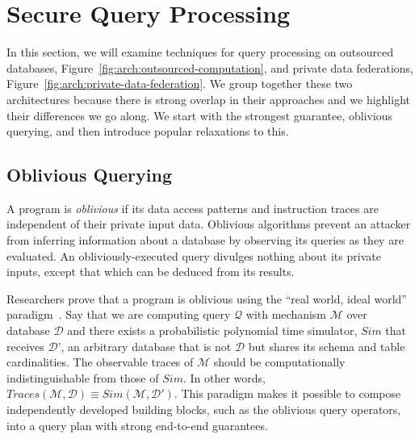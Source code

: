 \documentclass[11pt]{article}
\newcommand{\mechanism}{$\mathcal{M}$\xspace}
\newcommand{\db}{$\mathcal{D}$\xspace}
\newcommand{\query}{$\mathcal{Q}$\xspace}
\newcommand{\cut}[1]{}
\begin{document}
\section{Secure Query Processing}
\label{sec:secure}

In this section, we will examine techniques for query processing on outsourced databases, Figure~\ref{fig:arch:outsourced-computation}, and private data federations, Figure~\ref{fig:arch:private-data-federation}.   We group together these two architectures because there is strong overlap in their approaches and we highlight their differences we go along. We start with the strongest guarantee, oblivious querying, and then introduce popular relaxations to this. 

\subsection{Oblivious Querying}
\label{sec:oblivious}

A program is {\em oblivious} if its data access patterns and instruction traces are independent of their private input data.   \cut{An oblivious program's control flow does not change as a function of its private inputs.}  Oblivious algorithms prevent an attacker from inferring information about a database by observing its queries as they are evaluated.  An obliviously-executed query divulges nothing about its private inputs, except that which can be deduced from its results.

Researchers prove that a program is oblivious using the ``real world, ideal world'' paradigm~\cite{Canetti2001}.  Say that we are computing query  \query with mechanism \mechanism over database \db and there exists a probabilistic polynomial time simulator, $Sim$ that receives \db', an arbitrary database that is not \db but shares its schema and table cardinalities.   The observable traces of \mechanism should be computationally indistinguishable from those of $Sim$.  In other words, $Traces(\mathcal{M}, \mathcal{D}) \equiv Sim(\mathcal{M}, \mathcal{D}')$.  This paradigm makes it possible to compose independently developed building blocks, such as the oblivious query operators, into a query plan with strong end-to-end guarantees.  
\end{document}
